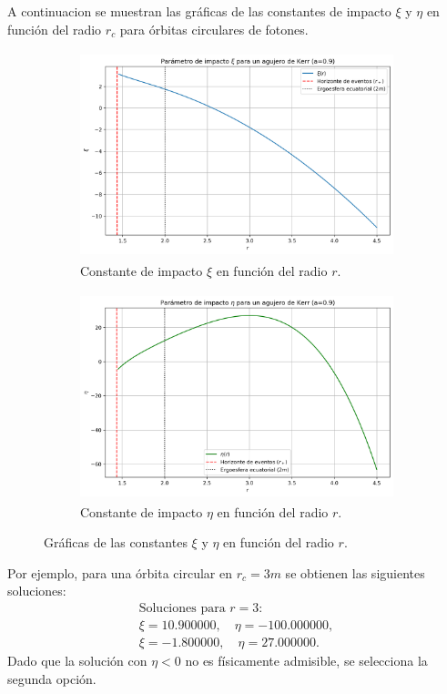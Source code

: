 A continuacion se muestran las gráficas de las constantes de impacto $\xi$ y $\eta$ en función del radio $r_c$ para órbitas circulares de fotones.
\begin{figure}[H]
\begin{subfigure}{0.5\textwidth}
\includegraphics[width=0.9\linewidth, height=6cm]{AgujerosNegros/kerr/geodesics_plots/circular_xi_vs_r_kerr.png} 
\caption{Constante de impacto $\xi$ en función del radio $r$.}
\end{subfigure}
\begin{subfigure}{0.5\textwidth}
\includegraphics[width=0.9\linewidth, height=6cm]{AgujerosNegros/kerr/geodesics_plots/circular_eta_vs_r_kerr.png}
\caption{Constante de impacto $\eta$ en función del radio $r$.}
\end{subfigure}
\caption{Gráficas de las constantes $\xi$ y $\eta$ en función del radio $r$.}
\end{figure}
Por ejemplo, para una órbita circular en $r_c = 3m$ se obtienen las siguientes soluciones:
\begin{equation}
\begin{array}{l}
\text{Soluciones para } r=3: \\
\xi = 10.900000,\quad \eta = -100.000000, \\
\xi = -1.800000,\quad \eta = 27.000000.
\end{array}
\end{equation}
Dado que la solución con $\eta < 0$ no es físicamente admisible, se selecciona la segunda opción.

